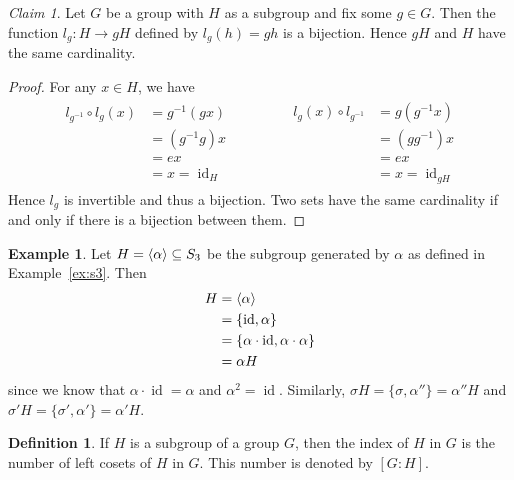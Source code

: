 \documentclass[12pt,letterpaper,DIV=11,final]{scrartcl}
\theoremstyle{plain}
\theoremstyle{definition}
\newtheorem{definition}{Definition}[section]
\newtheorem{example}{Example}[section]
\theoremstyle{remark}
\newtheorem{claim}{Claim}
\DeclareMathOperator{\id}{id}
\begin{document}
\begin{claim}
  Let $G$ be a group with $H$ as a subgroup and fix some $g \in G$.
  Then the function $l_g : H \to gH$ defined by $l_g(h) = gh$ is a bijection.
  Hence $gH$ and $H$ have the same cardinality.

  \begin{proof}
    For any $x \in H$, we have
    \begin{align*}
      \begin{aligned}
        l_{g^{-1}} \circ l_g(x) &= g^{-1}(gx) \\
                                &= (g^{-1} g) x \\
                                &= ex \\
                                &= x = \id_H
      \end{aligned}
      \qquad \qquad
      \begin{aligned}
        l_g(x) \circ l_{g^{-1}} &= g(g^{-1} x) \\
                                &= (g g^{-1}) x \\
                                &= ex \\
                                &= x = \id_{gH}
      \end{aligned}
    \end{align*}
    Hence $l_g$ is invertible and thus a bijection.
    Two sets have the same cardinality if and only if there is a bijection between them.
  \end{proof}
\end{claim}

\begin{example}
  Let $H = \braket{\alpha} \subseteq S_3$ be the subgroup generated by $\alpha$ as defined in Example~\ref{ex:s3}.
  Then
  \begin{align*}
    H &= \braket{\alpha} \\
      &= \{ \id, \alpha \} \\
      &= \{ \alpha \cdot \id, \alpha \cdot \alpha \} \\
      &= \alpha H
  \end{align*}
  since we know that $\alpha \cdot \id = \alpha$ and $\alpha^2 = \id$.
  Similarly, $\sigma H = \{ \sigma, \alpha'' \} = \alpha'' H$ and $\sigma' H = \{ \sigma', \alpha' \} = \alpha' H$.
\end{example}

\begin{definition}
  If $H$ is a subgroup of a group $G$, then the index of $H$ in $G$ is the number of left cosets of $H$ in $G$.
  This number is denoted by $[G : H]$.
\end{definition}
\end{document}

